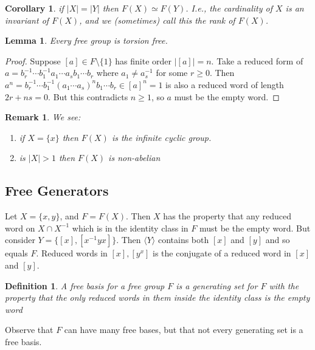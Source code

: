 \documentclass[a4paper,10pt]{article}
\newtheorem{Def}[thm]{Definition}
\newtheorem{Cor}[thm]{Corollary}
\newtheorem{Lem}[thm]{Lemma}
\newtheorem{rem}[thm]{Remark}
\begin{document}
\begin{Cor}
if $|X| = |Y|$ then $F(X) \simeq F(Y)$. I.e., the cardinality of $X$ is an invariant of $F(X)$, and we (sometimes) call this the rank of $F(X)$. 
\end{Cor}

\begin{Lem}
Every free group is torsion free. 
\end{Lem}
\begin{proof}
Suppose $[a] \in F \setminus \{ 1 \}$ has finite order $|[a]| = n$. Take a reduced form of $a = b_r^{-1} \cdots b_1^{-1} a_1 \cdots a_s b_1 \cdots b_r$ where $a_1 \neq a_s^{-1}$ for some $r \geq 0$. Then $a^n =  b_r^{-1} \cdots b_1^{-1} (a_1 \cdots a_s)^n b_1 \cdots b_r \in [a]^n = 1$ is also a reduced word of length $2r + ns = 0$. But this contradicts $n \geq 1$, so $a$ must be the empty word. 
\end{proof}

\begin{rem}
We see:
\begin{enumerate}
\item if $X = \{x\}$ then $F(X)$ is the infinite cyclic group.
\item is $|X| > 1$ then $F(X)$ is non-abelian
\end{enumerate}
\end{rem}

\subsection{Free Generators}

Let $X = \{x,y\}$, and $F = F(X)$. Then $X$ has the property that any reduced word on $X \cap X^{-1}$ which is in the identity class in $F$ must be the empty word. But consider $Y = \{ [x], [x^{-1} y x]\}$. Then $\langle Y \rangle$ contains both $[x]$ and $[y]$ and so equals $F$. Reduced words in $[x], [y^x]$ is the conjugate of a reduced word in $[x]$ and $[y]$.


\begin{Def}
A free basis for a free group $F$ is a generating set for $F$ with the property that the only reduced words in them inside the identity class is the empty word
\end{Def}

Observe that $F$ can have many free bases, but that not every generating set is a free basis.  
\end{document}
